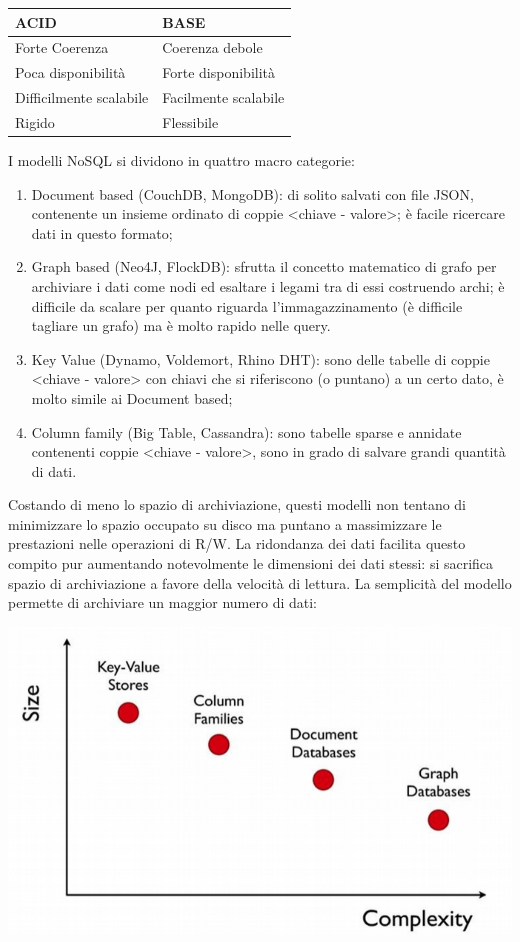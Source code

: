 \documentclass[a4page, 11pt]{article}
\begin{document}
\begin{center}
\begin{tabular}{l|l}
ACID & BASE \\
\hline
Forte Coerenza & Coerenza debole \\
Poca disponibilità & Forte disponibilità \\
Difficilmente scalabile & Facilmente scalabile\\
Rigido & Flessibile \\
\end{tabular}
\end{center}

I modelli NoSQL si dividono in quattro macro categorie\cite{NoSQLDB, GraphDB}:
\begin{enumerate}[noitemsep]
\item Document based (CouchDB, MongoDB): di solito salvati con file JSON, contenente un insieme ordinato di coppie \textless{}chiave - valore\textgreater{}; è facile ricercare dati in questo formato;
\item Graph based (Neo4J, FlockDB): sfrutta il concetto matematico di grafo per archiviare i dati come nodi ed esaltare i legami tra di essi costruendo archi; è difficile da scalare per quanto riguarda l'immagazzinamento (è difficile tagliare un grafo) ma è molto rapido nelle query.
\item Key Value (Dynamo, Voldemort, Rhino DHT): sono delle tabelle di coppie \textless{}chiave - valore\textgreater{} con chiavi che si riferiscono (o puntano) a un certo dato, è molto simile ai Document based;
\item Column family (Big Table, Cassandra): sono tabelle sparse e annidate contenenti coppie \textless{}chiave - valore\textgreater{}, sono in grado di salvare grandi quantità di dati.
\end{enumerate}

Costando di meno lo spazio di archiviazione, questi modelli non tentano di minimizzare lo spazio occupato su disco ma puntano a massimizzare le prestazioni nelle operazioni di R/W.
La ridondanza dei dati facilita questo compito pur aumentando notevolmente le dimensioni dei dati stessi: si sacrifica spazio di archiviazione a favore della velocità di lettura.
La semplicità del modello permette di archiviare un maggior numero di dati:
\begin{center}
	\includegraphics[scale=0.4]{IMAGE1.jpg}
\end{center}
\end{document}
